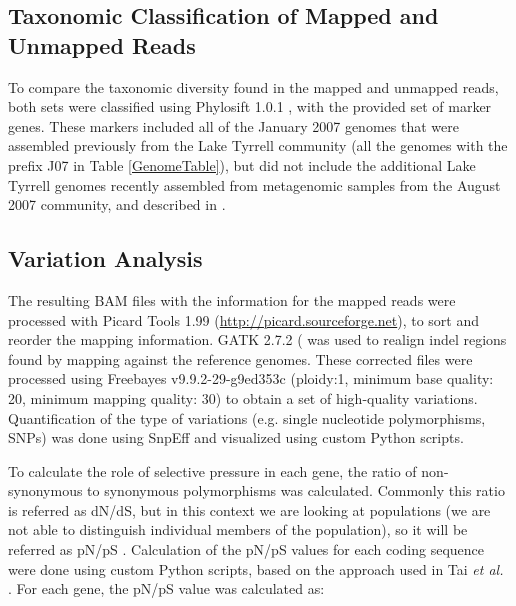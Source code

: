 \subsection{Taxonomic Classification of Mapped and Unmapped Reads}

To compare the taxonomic diversity found in the mapped and unmapped reads, both sets were classified using Phylosift 1.0.1 \cite{Darling:2014ej}, with the provided set of marker genes. These markers included all of the January 2007 genomes that were assembled previously from the Lake Tyrrell community \cite{Narasingarao:2012kp,Podell:2013kx} (all the genomes with the prefix J07 in Table \ref{GenomeTable}), but did not include the additional Lake Tyrrell genomes recently assembled from metagenomic samples from the August 2007 community, and described in \cite{Podell:2013fp}.

\subsection{Variation Analysis}

The resulting BAM files with the information for the mapped reads were processed with Picard Tools 1.99 (\url{http://picard.sourceforge.net}), to sort and reorder the mapping information. GATK 2.7.2 (\cite{DePristo:2011fo} was used to realign indel regions found by mapping against the reference genomes. These corrected files were processed using Freebayes v9.9.2-29-g9ed353c \cite{Garrison:2012wb} (ploidy:1, minimum base quality: 20, minimum mapping quality: 30) to obtain a set of high-quality variations. Quantification of the type of variations (e.g. single nucleotide polymorphisms, SNPs) was done using SnpEff \cite{Cingolani:2012cz} and visualized using custom Python scripts. 

To calculate the role of selective pressure in each gene, the ratio of non-synonymous to synonymous polymorphisms was calculated. Commonly this ratio is referred as dN/dS, but in this context we are looking at populations (we are not able to distinguish individual members of the population), so it will be referred as pN/pS \cite{Schloissnig:2012hx}. Calculation of the pN/pS values for each coding sequence were done using custom Python scripts, based on the approach used in Tai \textit{et al.} \cite{Tai:2011jo}. For each gene, the pN/pS value was calculated as:

\begin{center}
\end{center}

